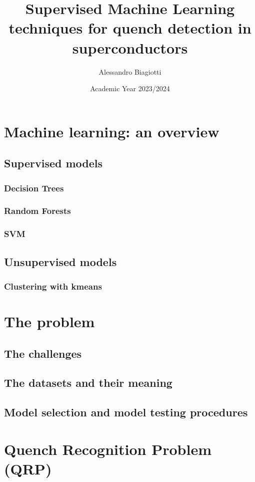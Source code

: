 \documentclass[a4paper]{book}
\title{\textsf{Supervised Machine Learning techniques for quench detection in superconductors}}
\author{Alessandro Biagiotti}
\date{Academic Year 2023/2024}
\begin{document}
\frontmatter

\maketitle

\tableofcontents

\mainmatter


\chapter{Machine learning: an overview}
\section{Supervised models}
\subsection{Decision Trees}
\subsection{Random Forests}
\subsection{SVM}
\section{Unsupervised models}
\subsection{Clustering with k\-means}
\chapter{The problem}
\section{The challenges}
\section{The datasets and their meaning}
\section{Model selection and model testing procedures}
\chapter{Quench Recognition Problem (QRP)}
\end{document}
